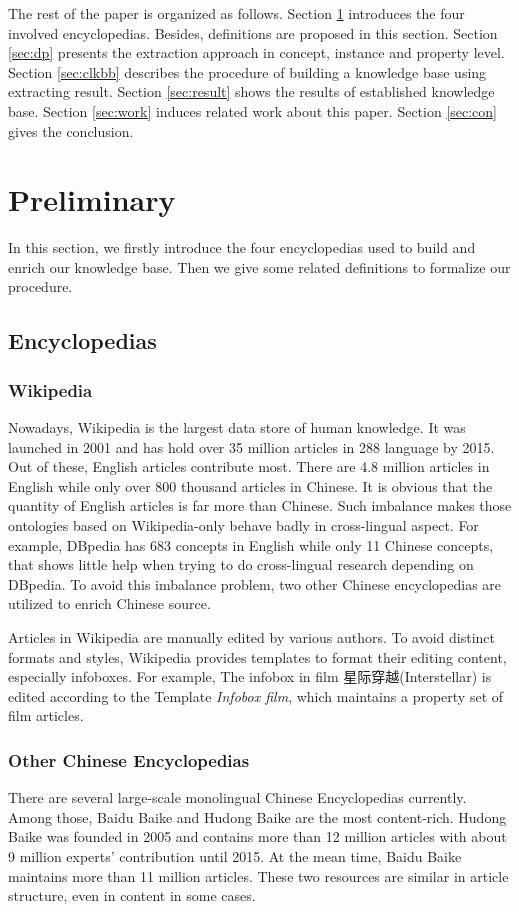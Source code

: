 \documentclass[runningheads,a4paper]{llncs}
\begin{document}
The rest of the paper is organized as follows. Section \ref{sec:pre} introduces the four involved encyclopedias. Besides, definitions are proposed in this section. Section \ref{sec:dp} presents the extraction approach in concept, instance and property level. Section \ref{sec:clkbb} describes the procedure of building a knowledge base using extracting result. Section \ref{sec:result} shows the results of established knowledge base. Section \ref{sec:work} induces related work about this paper. Section \ref{sec:con} gives the conclusion.

\section{Preliminary}
\label{sec:pre}
In this section, we firstly introduce the four encyclopedias used to build and enrich our knowledge base. Then we give some related definitions to formalize our procedure.

\subsection{Encyclopedias}
\label{sec:encyclopedias}
\subsubsection{Wikipedia}
Nowadays, Wikipedia is the largest data store of human knowledge. It was launched in 2001 and has hold over 35 million articles in 288 language by 2015. Out of these, English articles contribute most. There are 4.8 million articles in English while only over 800 thousand articles in Chinese. It is obvious that the quantity of English articles is far more than Chinese. Such imbalance makes those ontologies based on Wikipedia-only behave badly in cross-lingual aspect. For example, DBpedia has 683 concepts in English while only 11 Chinese concepts, that shows little help when trying to do cross-lingual research depending on DBpedia. To avoid this imbalance problem, two other Chinese encyclopedias are utilized to enrich Chinese source.

Articles in Wikipedia are manually edited by various authors. To avoid distinct formats and styles, Wikipedia provides templates to format their editing content, especially infoboxes. For example, The infobox in film 星际穿越(Interstellar) is edited according to the Template \emph{Infobox film}, which maintains a property set of film articles.

\subsubsection{Other Chinese Encyclopedias}
There are several large-scale monolingual Chinese Encyclopedias currently. Among those, Baidu Baike and Hudong Baike are the most content-rich. Hudong Baike was founded in 2005 and contains more than 12 million articles with about 9 million experts' contribution until 2015. At the mean time, Baidu Baike maintains more than 11 million articles. These two resources are similar in article structure, even in content in some cases.
\end{document}

